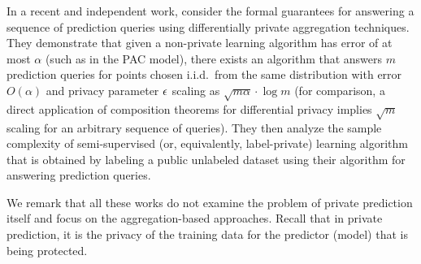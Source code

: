 \documentclass[final,12pt]{colt2018}
\begin{document}
In a recent and independent work, \citet{BassilyTT:18} consider the formal guarantees for answering a sequence of prediction queries using differentially private aggregation techniques. They demonstrate that given a non-private learning algorithm has error of at most $\alpha$ (such as in the PAC model), there exists an algorithm that answers $m$ prediction queries for points chosen i.i.d.~from the same distribution with error $O(\alpha)$ and privacy parameter $\epsilon$ scaling as $\sqrt{m \alpha} \cdot \log m$ (for comparison, a direct application of composition theorems for differential privacy implies $\sqrt{m}$ scaling for an arbitrary sequence of queries). They then analyze the sample complexity of semi-supervised (or, equivalently, label-private) learning algorithm that is obtained by labeling a public unlabeled dataset using their algorithm for answering prediction queries.

We remark that all these works do not examine the problem of private prediction itself and focus on the aggregation-based approaches. Recall that in private prediction, it is the privacy of the training data for the predictor (model) that is being protected. 

\end{document}
